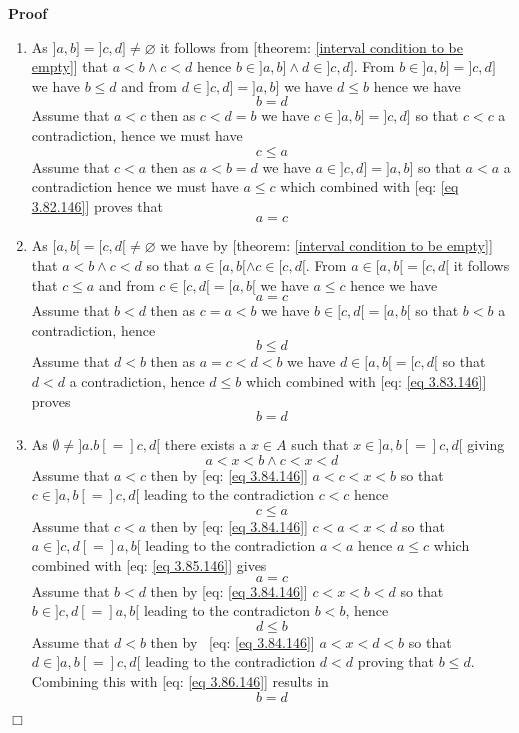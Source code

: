 \documentclass{book}
\newenvironment{proof}{\noindent\textbf{Proof\ }}{\hspace*{\fill}$\Box$\medskip}
\begin{document}
\begin{proof}
\begin{enumerate}
    \item As $] a, b] =] c, d] \neq \varnothing$ it follows from [theorem:
    \ref{interval condition to be empty}] that $a < b \wedge c < d$ hence $b
    \in] a, b] \wedge d \in] c, d]$. From $b \in] a, b] =] c, d]$ we have $b
    \leqslant d$ and from $d \in] c, d] =] a, b]$ we have $d \leqslant b$
    hence we have
    \[ b = d \]
    Assume that $a < c$ then as $c < d = b$ we have $c \in] a, b] =] c, d]$ so
    that $c < c$ a contradiction, hence we must have
    \begin{equation}
      \label{eq 3.82.146} c \leqslant a
    \end{equation}
    Assume that $c < a$ then as $a < b = d$ we have $a \in] c, d] =] a, b]$ so
    that $a < a$ a contradiction hence we must have $a \leq c$ which combined
    with [eq: \ref{eq 3.82.146}] proves that
    \[ a = c \]
    \item As $[a, b [= [c, d [\neq \varnothing$ we have by [theorem:
    \ref{interval condition to be empty}] that $a < b \wedge c < d$ so that $a
    \in [a, b [\wedge c \in [c, d [$. From $a \in [a, b [= [c, d [$ it follows
    that $c \leqslant a$ and from $c \in [c, d [= [a, b [$ we have $a
    \leqslant c$ hence we have
    \[ a = c \]
    Assume that $b < d$ then as $c = a < b$ we have $b \in [c, d [= [a, b [$
    so that $b < b$ a contradiction, hence
    \begin{equation}
      \label{eq 3.83.146} b \leqslant d
    \end{equation}
    Assume that $d < b$ then as $a = c < d < b$ we have $d \in [a, b [= [c, d
    [$ so that $d < d$ a contradiction, hence $d \leqslant b$ which combined
    with [eq: \ref{eq 3.83.146}] proves
    \[ b = d \]
    \item As $\emptyset \neq] a.b [=] c, d [$ there exists a $x \in A$ such
    that $x \in] a, b [=] c, d [$ giving
    \begin{equation}
      \label{eq 3.84.146} a < x < b \wedge c < x < d
    \end{equation}
    Assume that $a < c$ then by [eq: \ref{eq 3.84.146}] $a < c < x < b$ so
    that $c \in] a, b [=] c, d [$ leading to the contradiction $c < c$ hence
    \begin{equation}
      \label{eq 3.85.146} c \leqslant a
    \end{equation}
    Assume that $c < a$ then by [eq: \ref{eq 3.84.146}] $c < a < x < d$ so
    that $a \in] c, d [=] a, b [$ leading to the contradiction $a < a$ hence
    $a \leqslant c$ which combined with [eq: \ref{eq 3.85.146}] gives
    \[ a = c \]
    Assume that $b < d$ then by [eq: \ref{eq 3.84.146}] $c < x < b < d$ so
    that $b \in] c, d [=] a, b [$ leading to the contradicton $b < b$, hence
    \begin{equation}
      \label{eq 3.86.146} d \leqslant b
    \end{equation}
    Assume that $d < b$ then by \ [eq: \ref{eq 3.84.146}] $a < x < d < b$ so
    that $d \in] a, b [=] c, d [$ leading to the contradiction $d < d$ proving
    that $b \leqslant d$. Combining this with [eq: \ref{eq 3.86.146}] results
    in
    \[ b = d \]
  \end{enumerate}
\end{proof}
\end{document}
